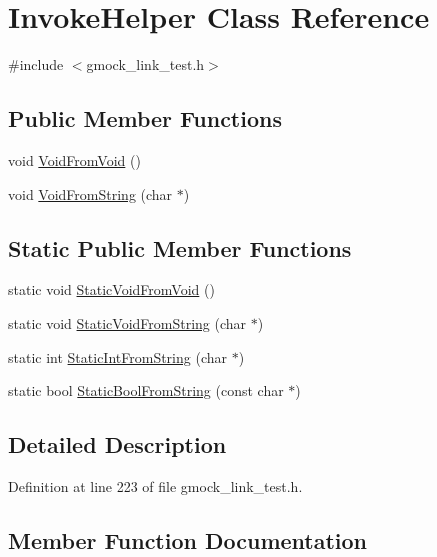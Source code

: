 \hypertarget{class_invoke_helper}{}\section{Invoke\+Helper Class Reference}
\label{class_invoke_helper}


{\ttfamily \#include $<$gmock\+\_\+link\+\_\+test.\+h$>$}

\subsection*{Public Member Functions}
\begin{DoxyCompactItemize}
\item 
void \hyperlink{class_invoke_helper_a6371bcb64a8f01093f6fdef60776a031}{Void\+From\+Void} ()
\item 
void \hyperlink{class_invoke_helper_a89f02dc384e6b5a7d935b7ea0a81cc9e}{Void\+From\+String} (char $\ast$)
\end{DoxyCompactItemize}
\subsection*{Static Public Member Functions}
\begin{DoxyCompactItemize}
\item 
static void \hyperlink{class_invoke_helper_ae96b5bd7c4fa328d0a87bc986f135fe8}{Static\+Void\+From\+Void} ()
\item 
static void \hyperlink{class_invoke_helper_a5e95ce4214e89b180da9953d94396536}{Static\+Void\+From\+String} (char $\ast$)
\item 
static int \hyperlink{class_invoke_helper_a5cfb11cca70ec5a9f59e8b7a4d4c2f85}{Static\+Int\+From\+String} (char $\ast$)
\item 
static bool \hyperlink{class_invoke_helper_aef16e38107cd8ddc0a52d7d0ab153211}{Static\+Bool\+From\+String} (const char $\ast$)
\end{DoxyCompactItemize}


\subsection{Detailed Description}


Definition at line 223 of file gmock\+\_\+link\+\_\+test.\+h.



\subsection{Member Function Documentation}
